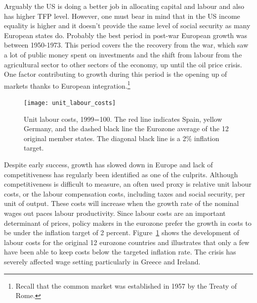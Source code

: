 \documentclass{tufte-handout}
\begin{document}
Arguably the US is doing a better job in allocating capital and labour and also has higher TFP level. 
However, one must bear in mind that in the US income equality is higher and it doesn't provide the same level of social security as many European states do.
Probably the best period in post-war European growth was between 1950-1973. 
This period covers the the recovery from the war, which saw a lot of public money spent on investments and the shift from labour from the agricultural sector to other sectors of the economy, up until the oil price crisis. 
One factor contributing to growth during this period is the opening up of markets thanks to European integration.\footnote{Recall that the common market was established in 1957 by the Treaty of Rome.}
\begin{figure}
  \texttt{[image: unit\_labour\_costs]}
  \label{fig:ulc}
  \caption{Unit labour costs, 1999=100. The red line indicates Spain, yellow Germany, and the dashed black line the Eurozone average of the 12 original member states. The diagonal black line is a 2\% inflation target.}
\end{figure}
Despite early success, growth has slowed down in Europe and lack of competitiveness has regularly been identified as one of the culprits. 
Although competitiveness is difficult to measure, an often used proxy is relative unit labour costs, or the labour compensation costs, including taxes and social security, per unit of output. 
These costs will increase when the growth rate of the nominal wages out paces labour productivity. 
Since labour costs are an important determinant of prices, policy makers in the eurozone prefer the growth in costs to be under the inflation target of 2 percent. 
Figure~\ref{fig:ulc} shows the development of labour costs for the original 12 eurozone countries and illustrates that only a few have been able to keep costs below the targeted inflation rate. 
The crisis has severely affected wage setting particularly in Greece and Ireland. 
\end{document}
